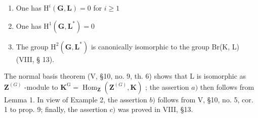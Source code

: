 \begin{enumerate}
\def\labelenumi{\alph{enumi})}
\item
  One has \(\mathrm{H}^i (\mathbf{G},\mathbf{L}) = 0\) for \(i\geqslant 1\)
\item
  One has \(\mathrm{H}^1 (\mathbf{G},\mathbf{L}^*) = 0\)
\item
  The group \(\mathrm{H}^2 (\mathbf{G},\mathbf{L}^*)\) is canonically isomorphic to the group Br(K, L) (VIII, § 13).
\end{enumerate}

The normal basis theorem (V, §10, no. 9, th. 6) shows that L is isomorphic as \(\mathbf{Z}^{(G)}\) -module to \(\mathbf{K}^{\mathrm{G}} = \operatorname{Hom}_{\mathbf{Z}}(\mathbf{Z}^{(G)}, \mathbf{K})\) ; the assertion \(a)\) then follows from Lemma 1. In view of Example 2, the assertion \(b)\) follows from V, §10, no. 5, cor. 1 to prop. 9; finally, the assertion \(c)\) was proved in VIII, §13.

